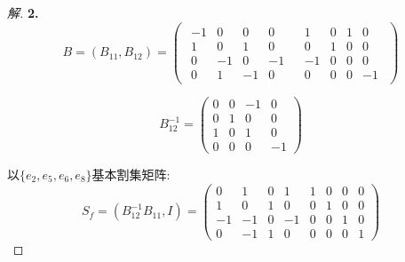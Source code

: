 \documentclass[UTF8, onecolumn, a4paper]{article}
\begin{document}
\begin{description}
\begin{proof}[解]
\textbf{2.}
$$B = (B_{11}, B_{12}) = 
\left(\begin{array}{c|c}
\begin{matrix}
-1& 0 &0 &0 \\
1& 0& 1& 0\\
0 &-1& 0& -1 \\
0 &1 &-1 &0
\end{matrix}&
\begin{matrix}
1 &0 &1 &0\\
0& 1& 0& 0\\
-1& 0 &0 &0\\
0 &0& 0 &-1
\end{matrix}
\end{array}
\right)$$

$$B_{12}^{-1} = 
\begin{pmatrix}
	0& 0 &-1 &0 \\
	0 &1 &0 &0 \\
	1& 0& 1& 0 \\
	0& 0& 0& -1
\end{pmatrix}$$

以$\{e_2,e_5,e_6,e_8\}$基本割集矩阵:
$$S_f = (B_{12}^{-1}B_{11}, I) = 
	\begin{pmatrix}
	0& 1 &0 &1 &1& 0 &0 &0\\
	1 &0 &1 &0 &0 &1 &0& 0\\
	-1& -1& 0& -1 &0& 0& 1& 0\\
	0& -1& 1& 0& 0& 0& 0& 1
	\end{pmatrix}
$$
\end{proof}


\end{description}
\end{document}
